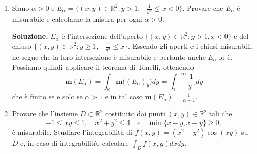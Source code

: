\begin{enumerate}
	\textbf{Soluzione.}
		L'insieme è chiuso e quindi misurabile. Se $(x,y,z) \in E$, allora in particolare $x^2 + y^2 \leq x$, pertanto $0 \leq x \leq 1$ e pertanto $|y| \leq 1$. Ne segue che l'insieme è limitato e ha quindi misura finita. Inoltre $E$ è normale rispetto al piano $xy$ e questo suggerisce di applicare il teorema di Tonelli come segue:
		\[
		\mathbf{m}(E) = \int_E dx dy dz = \int_{\mathbb{R}^2} \mathbf{m}_1(E_{(x,y)}) dx dy.
		\]
		Poiché $E_{(x,y)} \neq \emptyset$ se e solo se $x^2 + y^2 \leq x$, ovvero se e solo se
		\[
		\left(x - \frac{1}{2}\right)^2 + y^2 \leq \frac{1}{4}.
		\]
		Definendo $A = B\left(\left(\frac{1}{2}, 0\right), \frac{1}{2}\right)$ e completando i quadrati, ne segue che
		\[
		\begin{aligned}
			\mathbf{m}(E) &= \int_A (x - y^2 - x^2) dx dy \\
			&= \int_A \left(\frac{1}{4} - y^2 - \left(x - \frac{1}{2}\right)^2\right) dx dy \\
			&= \frac{1}{4} \mathbf{m}(A) - \int_A \left(y^2 + \left(x - \frac{1}{2}\right)^2\right) dx dy \\
			&\text{(traslando il dominio)} = \frac{1}{4} \mathbf{m}(A) - \int_{B(0,1/2)} (x^2 + y^2) dx dy.
		\end{aligned}
		\]
		Abbiamo $\mathbf{m}(A) = \pi/4$, quindi
		\[
		\mathbf{m}(E) = \frac{\pi}{16} - 2\pi \int_0^{1/2} \rho^3 d\rho = \frac{\pi}{16} - \frac{2^{-4}\pi}{2} = \frac{\pi}{32}.
		\]
	
	
	\item Siano $\alpha > 0$ e $E_{\alpha} = \{(x,y) \in \mathbb{R}^2 : y > 1, -\frac{1}{y^{\alpha}} \leq x < 0\}$. Provare che $E_{\alpha}$ è misurabile e calcolarne la misura per ogni $\alpha > 0$.
	
	
	\textbf{Soluzione.}
		$E_{\alpha}$ è l'intersezione dell'aperto $\{(x,y) \in \mathbb{R}^2 : y > 1, x < 0\}$ e del chiuso $\{(x,y) \in \mathbb{R}^2 : y \geq 1, -\frac{1}{y^{\alpha}} \leq x\}$. Essendo gli aperti e i chiusi misurabili, ne segue che la loro intersezione è misurabile e pertanto anche $E_{\alpha}$ lo è. Possiamo quindi applicare il teorema di Tonelli, ottenendo
		\[
		\mathbf{m}(E_{\alpha}) = \int_{\mathbb{R}} \mathbf{m}\big((E_{\alpha})_y\big) dy = \int_{1}^{+\infty} \frac{1}{y^{\alpha}} dy
		\]
		che è finito se e solo se $\alpha > 1$ e in tal caso $\mathbf{m}(E_{\alpha}) = \frac{1}{\alpha - 1}$.
	
	
	\item Provare che l'insieme $D \subset \mathbb{R}^2$ costituito dai punti $(x,y) \in \mathbb{R}^2$ tali che
	\[
	-1 \leq xy \leq 1, \quad x^2 + y^2 \leq 4 \quad \text{e} \quad \min\{x - y, x + y\} \geq 0,
	\]
	è misurabile. Studiare l'integrabilità di $f(x,y) = (x^2 - y^2) \cos(xy)$ su $D$ e, in caso di integrabilità, calcolare $\int_D f(x,y) dx dy$.
	

\end{enumerate}
